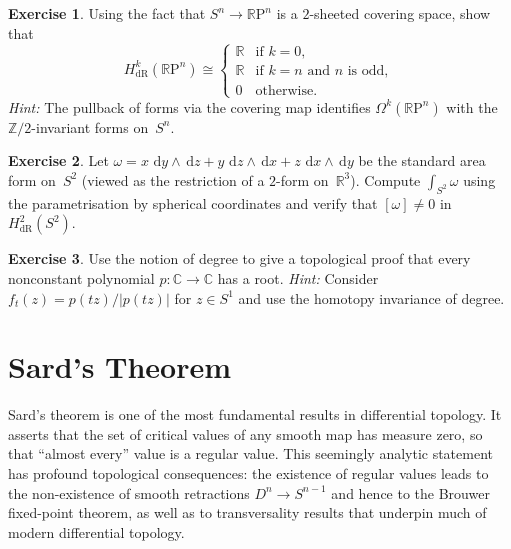 \documentclass[12pt,a4paper,openany]{book}
\theoremstyle{definition}
\newtheorem{exercise}{Exercise}[chapter]
\theoremstyle{remark}
\newcommand{\Z}{\mathbb{Z}}
\newcommand{\R}{\mathbb{R}}
\newcommand{\C}{\mathbb{C}}
\newcommand{\RP}{\mathbb{R}\mathrm{P}}
\newcommand{\dd}{\,\mathrm{d}}
\newcommand{\abs}[1]{\left\lvert #1 \right\rvert}
\begin{document}
\begin{exercise}\label{exo:cohomology-RPn}
Using the fact that $S^n\to\RP^n$ is a $2$-sheeted covering space,
show that
\[
  H^k_{\mathrm{dR}}(\RP^n)\cong\begin{cases}
  \R & \text{if } k = 0, \\
  \R & \text{if } k = n \text{ and } n \text{ is odd}, \\
  0  & \text{otherwise}.
  \end{cases}
\]
\emph{Hint:} The pullback of forms via the covering map identifies
$\Omega^k(\RP^n)$ with the $\Z/2$-invariant forms on~$S^n$.
\end{exercise}

\begin{exercise}\label{exo:stokes-sphere-exact}
Let $\omega = x\,\dd y\wedge\dd z + y\,\dd z\wedge\dd x + z\,\dd x\wedge\dd y$
be the standard area form on~$S^2$ (viewed as the restriction of a
$2$-form on~$\R^3$).  Compute $\int_{S^2}\omega$ using the parametrisation
by spherical coordinates and verify that $[\omega]\ne 0$ in
$H^2_{\mathrm{dR}}(S^2)$.
\end{exercise}

\begin{exercise}\label{exo:degree-fund-thm-algebra}
Use the notion of degree to give a topological proof that every
nonconstant polynomial $p\colon\C\to\C$ has a root.
\emph{Hint:} Consider $f_t(z) = p(tz)/\abs{p(tz)}$ for $z\in S^1$
and use the homotopy invariance of degree.
\end{exercise}


\chapter{Sard's Theorem}\label{ch:sard}
\minitoc\vspace{1em}

Sard's theorem is one of the most fundamental
results in differential topology.  It asserts that the set of critical
values of any smooth map has measure zero, so that ``almost every''
value is a regular value.  This seemingly analytic statement has
profound topological consequences: the existence of regular values
leads to the non-existence of smooth retractions $D^n\to S^{n-1}$
and hence to the Brouwer fixed-point theorem, as well as to
transversality results that underpin much of modern differential
topology.
\end{document}
